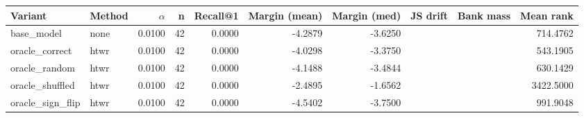 \begin{tabular}{l l r r r r r r r r}
\toprule
Variant & Method & $\alpha$ & n & Recall@1 & Margin (mean) & Margin (med) & JS drift & Bank mass & Mean rank \\
\midrule
base\_model & none & 0.0100 & 42 & 0.0000 & -4.2879 & -3.6250 &  &  & 714.4762 \\
oracle\_correct & htwr & 0.0100 & 42 & 0.0000 & -4.0298 & -3.3750 &  &  & 543.1905 \\
oracle\_random & htwr & 0.0100 & 42 & 0.0000 & -4.1488 & -3.4844 &  &  & 630.1429 \\
oracle\_shuffled & htwr & 0.0100 & 42 & 0.0000 & -2.4895 & -1.6562 &  &  & 3422.5000 \\
oracle\_sign\_flip & htwr & 0.0100 & 42 & 0.0000 & -4.5402 & -3.7500 &  &  & 991.9048 \\
\bottomrule
\end{tabular}
